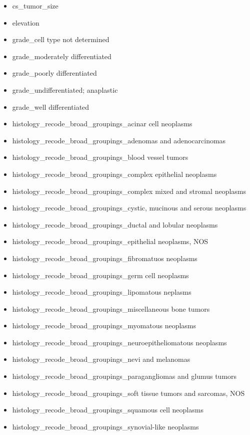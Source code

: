 \documentclass[a4paper,11pt]{article}
\begin{document}
\begin{itemize}[noitemsep]
\item cs\_tumor\_size
\item elevation
\item grade\_cell type not determined
\item grade\_moderately differentiated
\item grade\_poorly differentiated
\item grade\_undifferentiated; anaplastic
\item grade\_well differentiated
\item histology\_recode\_broad\_groupings\_acinar cell neoplasms
\item histology\_recode\_broad\_groupings\_adenomas and adenocarcinomas
\item histology\_recode\_broad\_groupings\_blood vessel tumors
\item histology\_recode\_broad\_groupings\_complex epithelial neoplasms
\item histology\_recode\_broad\_groupings\_complex mixed and stromal neoplasms
\item histology\_recode\_broad\_groupings\_cystic, mucinous and serous neoplasms
\item histology\_recode\_broad\_groupings\_ductal and lobular neoplasms
\item histology\_recode\_broad\_groupings\_epithelial neoplasms, NOS
\item histology\_recode\_broad\_groupings\_fibromatuos neoplasms
\item histology\_recode\_broad\_groupings\_germ cell neoplasms
\item histology\_recode\_broad\_groupings\_lipomatous neplasms
\item histology\_recode\_broad\_groupings\_miscellaneous bone tumors
\item histology\_recode\_broad\_groupings\_myomatous neoplasms
\item histology\_recode\_broad\_groupings\_neuroepitheliomatous neoplasms
\item histology\_recode\_broad\_groupings\_nevi and melanomas
\item histology\_recode\_broad\_groupings\_paragangliomas and glumus tumors
\item histology\_recode\_broad\_groupings\_soft tissue tumors and sarcomas, NOS
\item histology\_recode\_broad\_groupings\_squamous cell neoplasms
\item histology\_recode\_broad\_groupings\_synovial-like neoplasms

\end{itemize}
\end{document}
